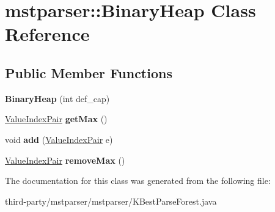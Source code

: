 \hypertarget{classmstparser_1_1BinaryHeap}{
\section{mstparser::BinaryHeap Class Reference}
\label{classmstparser_1_1BinaryHeap}
}
\subsection*{Public Member Functions}
\begin{DoxyCompactItemize}
\item 
\hypertarget{classmstparser_1_1BinaryHeap_ae6ac832bb173087de48d75d78ac3f54b}{
{\bfseries BinaryHeap} (int def\_\-cap)}
\label{classmstparser_1_1BinaryHeap_ae6ac832bb173087de48d75d78ac3f54b}

\item 
\hypertarget{classmstparser_1_1BinaryHeap_ad96ca18c1e77db50cc7be0649ae58266}{
\hyperlink{classmstparser_1_1ValueIndexPair}{ValueIndexPair} {\bfseries getMax} ()}
\label{classmstparser_1_1BinaryHeap_ad96ca18c1e77db50cc7be0649ae58266}

\item 
\hypertarget{classmstparser_1_1BinaryHeap_a04dd91d0b0508c570798773f79ca4c2c}{
void {\bfseries add} (\hyperlink{classmstparser_1_1ValueIndexPair}{ValueIndexPair} e)}
\label{classmstparser_1_1BinaryHeap_a04dd91d0b0508c570798773f79ca4c2c}

\item 
\hypertarget{classmstparser_1_1BinaryHeap_aee1fddce1f32ccc9ed548c2f5fd81447}{
\hyperlink{classmstparser_1_1ValueIndexPair}{ValueIndexPair} {\bfseries removeMax} ()}
\label{classmstparser_1_1BinaryHeap_aee1fddce1f32ccc9ed548c2f5fd81447}

\end{DoxyCompactItemize}


The documentation for this class was generated from the following file:\begin{DoxyCompactItemize}
\item 
third-\/party/mstparser/mstparser/KBestParseForest.java\end{DoxyCompactItemize}
